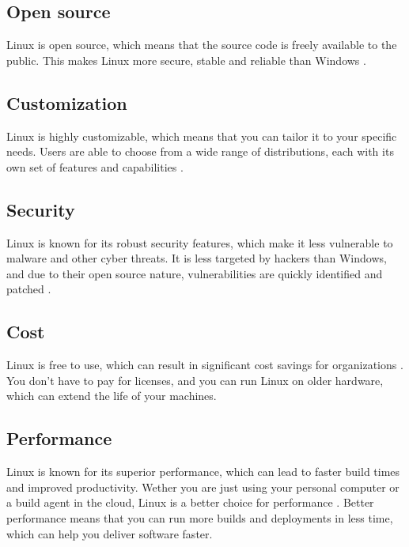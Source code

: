 \subsection{Open source}
Linux is open source, which means that the source code is freely available to the public. 
This makes Linux more secure, stable and reliable than Windows \autocite{Singh2023}.

\subsection{Customization}
Linux is highly customizable, which means that you can tailor it to your specific needs. 
Users are able to choose from a wide range of distributions, each with its own set of features and capabilities \autocite{Singh2023}.

\subsection{Security}
Linux is known for its robust security features, which make it less vulnerable to malware and other cyber threats.
It is less targeted by hackers than Windows, and due to their open source nature, vulnerabilities are quickly identified and patched \autocite{Singh2023}.

\subsection{Cost}
Linux is free to use, which can result in significant cost savings for organizations \autocite{Singh2023}. 
You don't have to pay for licenses, and you can run Linux on older hardware, which can extend the life of your machines.

\subsection{Performance}
Linux is known for its superior performance, which can lead to faster build times and improved productivity.
Wether you are just using your personal computer or a build agent in the cloud, Linux is a better choice for performance \autocite{Singh2023}.
Better performance means that you can run more builds and deployments in less time, which can help you deliver software faster.

